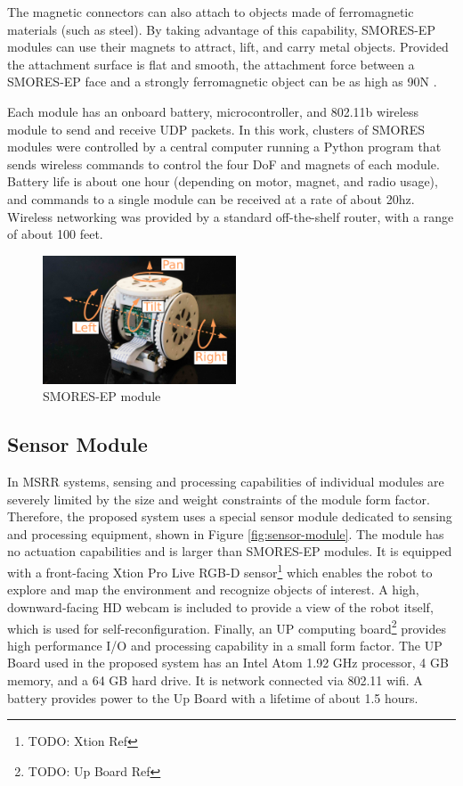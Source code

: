\documentclass[conference]{IEEEtran}
\begin{document}
The magnetic connectors can also attach to objects made of ferromagnetic
materials (such as steel).  By taking advantage of this capability, SMORES-EP
modules can use their magnets to attract, lift, and carry metal objects.
Provided the attachment surface is flat and smooth, the attachment force
between a SMORES-EP face and a strongly ferromagnetic object can be as high as
90N \cite{tosun2016design}.

Each module has an onboard battery, microcontroller, and 802.11b wireless
module to send and receive UDP packets.  In this work, clusters of SMORES
modules were controlled by a central computer running a Python program that
sends wireless commands to control the four DoF and magnets of each module.
Battery life is about one hour (depending on motor, magnet, and radio usage),
and commands to a single module can be received at a rate of about 20hz.
Wireless networking was provided by a standard off-the-shelf  router, with a
range of about 100 feet.

\begin{figure}   
\begin{center}
\includegraphics[height=1.5in]{images/smores_dof.pdf}
\end{center}
\caption{SMORES-EP module}
\label{fig:smores-module}
\end{figure}
%

\subsection{Sensor Module} %
\label{sec:sensor_module}
%

In MSRR systems, sensing and processing capabilities of individual modules are severely limited by the size and weight constraints of the module form factor. Therefore, the proposed system uses a special sensor module dedicated to sensing and processing equipment, shown in Figure \ref{fig:sensor-module}. The module has no actuation capabilities and is larger than SMORES-EP modules. It is equipped with a front-facing Xtion Pro Live RGB-D sensor\footnote{TODO: Xtion Ref} which enables the robot to explore and map the environment and recognize objects of interest. A high, downward-facing HD webcam is included to provide a view of the robot itself, which is used for self-reconfiguration. Finally, an UP computing board\footnote{TODO: Up Board Ref} provides high performance I/O and processing capability in a small form factor. The UP Board used in the proposed system has an Intel Atom 1.92 GHz processor, 4 GB memory, and a 64 GB hard drive. It is network connected via 802.11 wifi. A battery provides power to the Up Board with a lifetime of about 1.5 hours.
\end{document}

